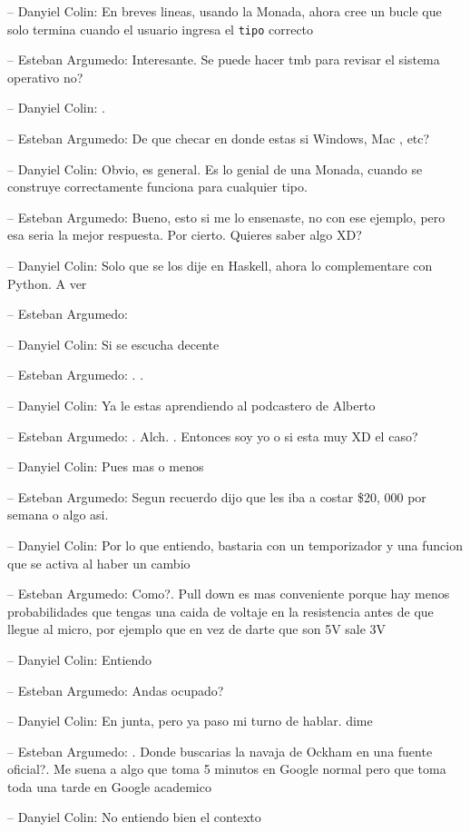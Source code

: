 -- Danyiel Colin: En breves lineas, usando la Monada, ahora cree un
bucle que solo termina cuando el usuario ingresa el \texttt{tipo}
correcto

-- Esteban Argumedo: Interesante. Se puede hacer tmb para revisar el
sistema operativo no?

-- Danyiel Colin: .

-- Esteban Argumedo: De que checar en donde estas si Windows, Mac , etc?

-- Danyiel Colin: Obvio, es general. Es lo genial de una Monada, cuando
se construye correctamente funciona para cualquier tipo.

-- Esteban Argumedo: Bueno, esto si me lo ensenaste, no con ese ejemplo,
pero esa seria la mejor respuesta. Por cierto. Quieres saber algo XD?

-- Danyiel Colin: Solo que se los dije en Haskell, ahora lo
complementare con Python. A ver

-- Esteban Argumedo:

-- Danyiel Colin: Si se escucha decente

-- Esteban Argumedo: . .

-- Danyiel Colin: Ya le estas aprendiendo al podcastero de Alberto

-- Esteban Argumedo: . Alch. . Entonces soy yo o si esta muy XD el caso?

-- Danyiel Colin: Pues mas o menos

-- Esteban Argumedo: Segun recuerdo dijo que les iba a costar \$20, 000
por semana o algo asi.

-- Danyiel Colin: Por lo que entiendo, bastaria con un temporizador y
una funcion que se activa al haber un cambio

-- Esteban Argumedo: Como?. Pull down es mas conveniente porque hay
menos probabilidades que tengas una caida de voltaje en la resistencia
antes de que llegue al micro, por ejemplo que en vez de darte que son 5V
sale 3V

-- Danyiel Colin: Entiendo

-- Esteban Argumedo: Andas ocupado?

-- Danyiel Colin: En junta, pero ya paso mi turno de hablar. dime

-- Esteban Argumedo: . Donde buscarias la navaja de Ockham en una fuente
oficial?. Me suena a algo que toma 5 minutos en Google normal pero que
toma toda una tarde en Google academico

-- Danyiel Colin: No entiendo bien el contexto

